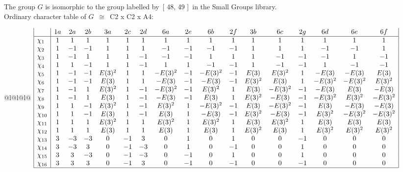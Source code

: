 \documentclass[varwidth=\maxdimen,border=10]{standalone}
\begin{document}
The group $G$ is isomorphic to the group labelled by\ [ 48, 49 ]\ in the Small Groups library.\\
Ordinary character table of $G$\ $\cong$\ C2 x C2 x A4:\\
\begin{center}
\begin{tabular}{@{}l@{}l@{}l@{}}
\hline
\(\begin{array}{|l|cccccccccccccccc|}
  & 1a & 2a & 2b & 3a & 2c & 2d & 6a & 2e & 6b & 2f & 3b & 6c & 2g & 6d & 6e & 6f\\ \hline
\chi_{1} & 1 & 1 & 1 & 1 & 1 & 1 & 1 & 1 & 1 & 1 & 1 & 1 & 1 & 1 & 1 & 1\\
\chi_{2} & 1 & -1 & -1 & 1 & 1 & 1 & -1 & -1 & -1 & -1 & 1 & 1 & 1 & -1 & -1 & 1\\
\chi_{3} & 1 & -1 & 1 & 1 & 1 & -1 & -1 & -1 & 1 & 1 & 1 & -1 & -1 & -1 & 1 & -1\\
\chi_{4} & 1 & 1 & -1 & 1 & 1 & -1 & 1 & 1 & -1 & -1 & 1 & -1 & -1 & 1 & -1 & -1\\
\chi_{5} & 1 & -1 & -1 & E(3)^{2} & 1 & 1 & -E(3)^{2} & -1 & -E(3)^{2} & -1 & E(3) & E(3)^{2} & 1 & -E(3) & -E(3) & E(3)\\
\chi_{6} & 1 & -1 & -1 & E(3) & 1 & 1 & -E(3) & -1 & -E(3) & -1 & E(3)^{2} & E(3) & 1 & -E(3)^{2} & -E(3)^{2} & E(3)^{2}\\
\chi_{7} & 1 & -1 & 1 & E(3)^{2} & 1 & -1 & -E(3)^{2} & -1 & E(3)^{2} & 1 & E(3) & -E(3)^{2} & -1 & -E(3) & E(3) & -E(3)\\
\chi_{8} & 1 & -1 & 1 & E(3) & 1 & -1 & -E(3) & -1 & E(3) & 1 & E(3)^{2} & -E(3) & -1 & -E(3)^{2} & E(3)^{2} & -E(3)^{2}\\
\chi_{9} & 1 & 1 & -1 & E(3)^{2} & 1 & -1 & E(3)^{2} & 1 & -E(3)^{2} & -1 & E(3) & -E(3)^{2} & -1 & E(3) & -E(3) & -E(3)\\
\chi_{10} & 1 & 1 & -1 & E(3) & 1 & -1 & E(3) & 1 & -E(3) & -1 & E(3)^{2} & -E(3) & -1 & E(3)^{2} & -E(3)^{2} & -E(3)^{2}\\
\chi_{11} & 1 & 1 & 1 & E(3)^{2} & 1 & 1 & E(3)^{2} & 1 & E(3)^{2} & 1 & E(3) & E(3)^{2} & 1 & E(3) & E(3) & E(3)\\
\chi_{12} & 1 & 1 & 1 & E(3) & 1 & 1 & E(3) & 1 & E(3) & 1 & E(3)^{2} & E(3) & 1 & E(3)^{2} & E(3)^{2} & E(3)^{2}\\
\chi_{13} & 3 & -3 & -3 & 0 & -1 & 3 & 0 & 1 & 0 & 1 & 0 & 0 & -1 & 0 & 0 & 0\\
\chi_{14} & 3 & -3 & 3 & 0 & -1 & -3 & 0 & 1 & 0 & -1 & 0 & 0 & 1 & 0 & 0 & 0\\
\chi_{15} & 3 & 3 & -3 & 0 & -1 & -3 & 0 & -1 & 0 & 1 & 0 & 0 & 1 & 0 & 0 & 0\\
\chi_{16} & 3 & 3 & 3 & 0 & -1 & 3 & 0 & -1 & 0 & -1 & 0 & 0 & -1 & 0 & 0 & 0\\
\hline
\end{array}\)\\
\end{tabular}
\end{center}
\end{document}
